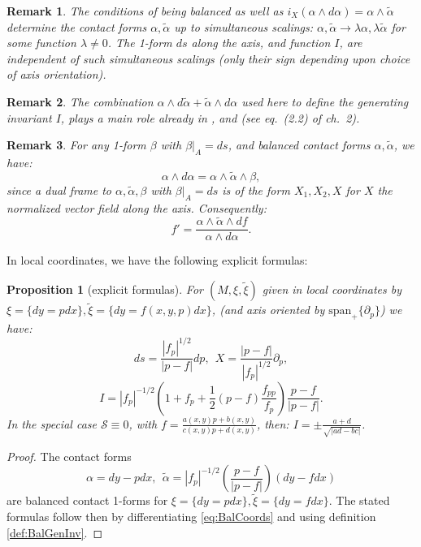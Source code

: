 \documentclass[10pt]{amsart}
\newcommand{\del}{\partial}
\newtheorem{prop}[thm]{Proposition}
\theoremstyle{definition}
\newtheorem{rem}{Remark}
\begin{document}
\begin{rem}
    {\em The conditions of being balanced as well as $i_X(\alpha\wedge d\alpha) = \alpha\wedge \tilde\alpha$ determine the contact forms $\alpha, \tilde\alpha$ up to simultaneous scalings: $\alpha, \tilde\alpha \to \lambda\alpha, \lambda\tilde\alpha$ for some function $\lambda \ne 0$. The 1-form $ds$ along the axis, and function $I$, are independent of such simultaneous scalings (only their sign depending upon choice of axis orientation).}
\end{rem}

\begin{rem}
    {\em The combination $\alpha\wedge d\tilde\alpha + \tilde\alpha\wedge d\alpha$ used here to define the generating invariant $I$, plays a main role already in \cite{Geig}, and \cite{ThurstEl} (see eq.~(2.2) of ch.~2).}
\end{rem}

\begin{rem}\label{rem:altForms}
{\em For any 1-form $\beta$ with $\beta|_A = ds$, and balanced contact forms $\alpha, \tilde\alpha$, we have:
\[ \alpha\wedge d\alpha = \alpha \wedge\tilde\alpha\wedge\beta, \]
since a dual frame to $\alpha, \tilde\alpha, \beta$ with $\beta|_A = ds$ is of the form $X_1, X_2, X$ for $X$ the normalized vector field along the axis. Consequently:
\[ f' = \frac{\alpha\wedge\tilde\alpha \wedge df}{\alpha\wedge d\alpha}. \] }
\end{rem}

In local coordinates, we have the following explicit formulas:

\begin{prop}[explicit formulas]\label{rem:explFormulasGen}
    For $(M, \xi, \tilde \xi)$ given in local coordinates by $\xi = \{ dy = pdx\}, \tilde \xi = \{ dy = f(x,y,p)dx\}$, (and axis oriented by $\text{span}_+\{ \del_p\}$) we have:
    \[ ds = \frac{|f_p|^{1/2}}{|p-f|} dp, ~~X = \frac{|p-f|}{|f_p|^{1/2}} \del_p, \]
    \[ I = |f_p|^{-1/2} \left( 1 + f_p + \frac12 (p-f) \frac{f_{pp}}{f_p} \right) \frac{p-f}{|p-f|}. \]
    In the special case $\mathcal{S}\equiv 0$, with $f = \frac{a(x,y) p + b(x,y)}{c(x,y)p + d(x,y)}$, then: $I = \pm \frac{a+d}{\sqrt{|ad-bc|}}$.
\end{prop}

\begin{proof}
The contact forms
\begin{equation}\label{eq:BalCoords}
    \alpha = dy - pdx, ~~\tilde\alpha = |f_p|^{-1/2}\left( \frac{p-f}{|p-f|}\right) (dy - f dx)
\end{equation} 
are balanced contact 1-forms for $\xi =\{ dy = pdx\}, \tilde\xi = \{ dy = fdx\}$. The stated formulas follow then by differentiating \eqref{eq:BalCoords} and using definition \ref{def:BalGenInv}.
\end{proof}
\end{document}
